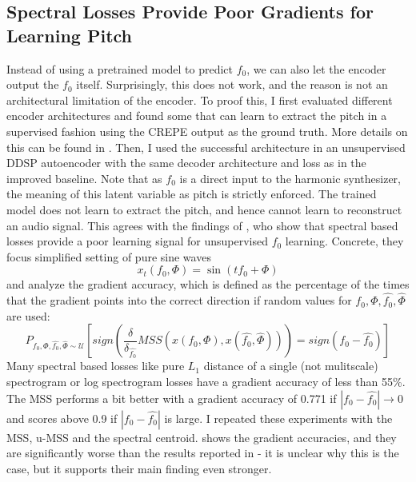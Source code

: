 \begin{theappendices}
\section{Spectral Losses Provide Poor Gradients for Learning Pitch}
Instead of using a pretrained model to predict $f_0$, we can also let the encoder output the $f_0$ itself.
Surprisingly, this does not work, and the reason is not an architectural limitation of the encoder.
To proof this, I first evaluated different encoder architectures and found some that can learn to extract the pitch in a supervised fashion using the CREPE output as the ground truth. More details on this can be found in .
Then, I used the successful architecture in an unsupervised DDSP autoencoder with the same decoder architecture and loss as in the improved baseline.
Note that as $f_0$ is a direct input to the harmonic synthesizer, the meaning of this latent variable as pitch is strictly enforced. 
The trained model does not learn to extract the pitch, and hence cannot learn to reconstruct an audio signal. \newline
This agrees with the findings of \citet{turian_im_nodate}, who show that spectral based losses provide a poor learning signal for unsupervised $f_0$ learning. Concrete, they focus simplified setting of pure sine waves
\begin{equation}
    x_t(f_0, \Phi) = \sin(t f_0 + \Phi)
\end{equation}
and analyze the gradient accuracy, which is defined as the percentage of the times that the gradient points into the correct direction if random values for $f_0, \Phi, \hat{f_0}, \hat{\Phi}$ are used:
\begin{equation}
    P_{f_0, \Phi, \hat{f_0}, \hat{\Phi} \sim \mathcal{U}} [  sign(\frac{\delta}{\delta_{\hat{f_0}}} MSS(x(f_0, \Phi), x(\hat{f_0}, \hat{\Phi}))) = sign(f_0 - \hat{f_0}) ]
\end{equation}
Many spectral based losses like pure $L_1$ distance of a single (not mulitscale) spectrogram or log spectrogram losses have a gradient accuracy of less than 55\%. The MSS performs a bit better with a gradient accuracy of 0.771 if $|f_0 - \hat{f_0}| \to 0 $ and scores above 0.9 if $|f_0 - \hat{f_0}|$ is large.
I repeated these experiments with the MSS, u-MSS and the spectral centroid.  shows the gradient accuracies, and they are significantly worse than the results reported in \citet{turian_im_nodate} - it is unclear why this is the case, but it supports their main finding even stronger.


\end{theappendices}
